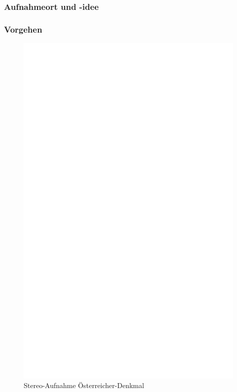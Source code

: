 \documentclass[liststotoc,bibtotoc,fontsize=14pt,]{scrreprt}
\begin{document}
\subsubsection{Aufnahmeort und -idee}


\subsubsection{Vorgehen}


\newpage
\begin{figure}[h]
	\includegraphics[width=\linewidth]{img/ph.jpg}
	\caption{Stereo-Aufnahme Österreicher-Denkmal}
\end{figure}
	
\end{document}
